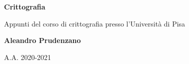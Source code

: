 \begin{titlepage}
    \begin{center}
        \vspace*{1cm}

        \huge
        \textbf{Crittografia}

        \vspace{0.5cm}

        Appunti del corso di crittografia presso l'Università di Pisa

        \vspace{1.5cm}

        \textbf{Aleandro Prudenzano}

        \vfill
        \vspace{0.8cm}

        A.A. 2020-2021            

    \end{center}
\end{titlepage}

\clearpage
\begingroup
  \pagestyle{empty}
  \null
  \newpage
\endgroup

\renewcommand{\contentsname}{Indice}
\tableofcontents

\clearpage
\begingroup
  \pagestyle{empty}
  \null
  \newpage
\endgroup
